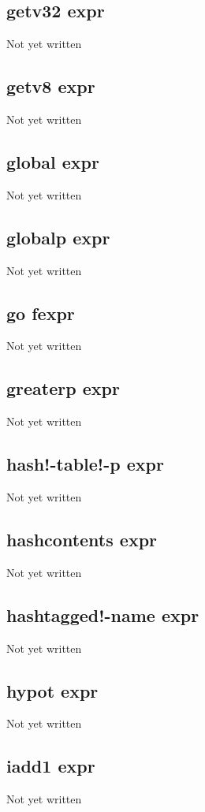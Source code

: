 \documentclass[a4paper,11pt]{article}
\begin{document}
\subsection{\ttfamily getv32 expr}
Not yet written

\subsection{\ttfamily getv8 expr}
Not yet written

\subsection{\ttfamily global expr}
Not yet written

\subsection{\ttfamily globalp expr}
Not yet written

\subsection{\ttfamily go fexpr}
Not yet written

\subsection{\ttfamily greaterp expr}
Not yet written

\subsection{\ttfamily hash!-table!-p expr}
Not yet written

\subsection{\ttfamily hashcontents expr}
Not yet written

\subsection{\ttfamily hashtagged!-name expr}
Not yet written

\subsection{\ttfamily hypot expr}
Not yet written

\subsection{\ttfamily iadd1 expr}
Not yet written
\end{document}
